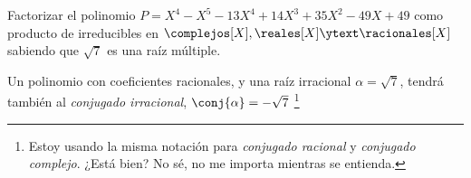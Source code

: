 \ejercicio
Factorizar el polinomio 
$
P = X^4 - X^5 - 13X^4 + 14X^3 + 35X^2 -49X + 49
$
como producto de irreducibles en $\complejos[X], \reales[X] \ytext \racionales[X]$ sabiendo que $\sqrt7$ es una
raíz múltiple.

\separadorCorto

Un polinomio con coeficientes racionales, y una raíz irracional
$\alpha = \sqrt7$,
tendrá también al \textit{conjugado irracional}, $\conj{\alpha} = -\sqrt{7}$
\footnote{Estoy usando la misma notación para \textit{conjugado racional} y \textit{conjugado complejo}. ¿Está bien? No sé, no me importa mientras se entienda.}

